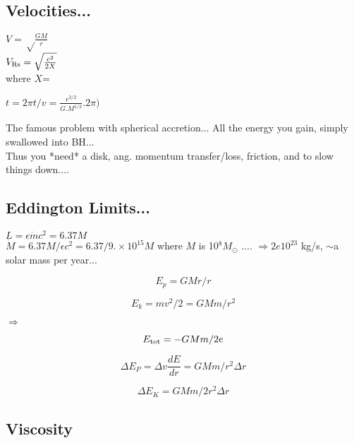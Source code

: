 \documentclass[11pt]{article}
\begin{document}
\subsection{Velocities...}
$V = \sqrt\frac{GM}{r}$\\
$V_{\rm Rs} = \sqrt\frac{c^{2}}{2X}$\\
where $X$=

\noindent
$t = 2\pi t / v = \frac{ r^{3/2}} {G. M^{1/2}} . 2\pi    ) $ 

\noindent
The famous problem with spherical accretion... 
All the energy you gain, simply swallowed into BH... \\ 

\noindent
Thus you *need* a disk, ang. momentum transfer/loss, friction, 
and to slow things down....\\


\subsection{Eddington Limits...}

\noindent
$L = \epsilon \dot{m} c^{2} = 6.37 M$ \\

\noindent
$\dot{M} = 6.37 M / \epsilon c^{2} = 6.37 / 9.\times10^{15} M $
where $M$ is 10$^{8} M_{\odot}$ ....
$\Rightarrow 2e10^{23}$ kg/s, 
$\sim$a solar mass per year...

\begin{equation}
E_p = GMr / r
\end{equation}

\begin{equation}
E_k = mv^{2} / 2 = GMm/ r^2
\end{equation}

$\Rightarrow$

\begin{equation}
E_{\rm tot} = - GMm / 2e
\end{equation}

\begin{equation}
\Delta E_P  = \Delta v \frac{dE}{dr} = GMm/r^2 \Delta r
\end{equation}

\begin{equation}
\Delta E_K   = GMm/2r^2 \Delta r
\end{equation}


\subsection{Viscosity}
\end{document}
